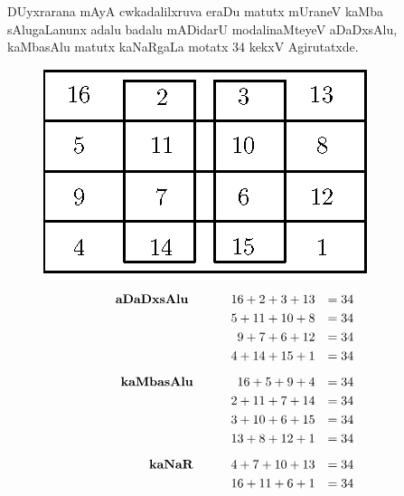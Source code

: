 DUyxrarana mAyA cwkadalilxruva eraDu matutx mUraneV kaMba sAlugaLanunx adalu badalu mADidarU modalinaMteyeV aDaDxsAlu, kaMbasAlu matutx kaNaRgaLa motatx {\rm 34} kekxV Agirutatxde.

\begin{figure}[H]
\centering
\includegraphics[scale=.8]{src/figures/m_125.eps}
\end{figure}

\begin{alignat*}{3}
\text{\bf aDaDxsAlu }\qquad  && 16+2+3+13&&=34\\
&&5+11+10+8&&=34\\
&&9+7+6+12&&=34\\
&&4+14+15+1&&=34\\[0.2cm]
\text{\bf kaMbasAlu} \qquad  &&16+5+9+4 &&=34\\
&&2+11+7+14&&=34\\
&&3+10+6+15&&=34\\
&&13+8+12+1&&=34\\[0.2cm]
\text{\bf kaNaR} \qquad  &&4+7+10+13 &&=34\\
&&16+11+6+1&&=34\\
\end{alignat*}
